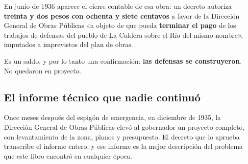 En junio de 1936 aparece el cierre contable de esa obra: un decreto autoriza \textbf{treinta
y dos pesos con ochenta y siete centavos} a favor de la Dirección General de Obras Públicas
«a objeto de que pueda \textbf{terminar el pago} de los trabajos de defensas del pueblo de La
Caldera sobre el Río del mismo nombre», imputados a imprevistos del plan de obras.

Es un saldo, y por lo tanto una confirmación: \textbf{las defensas se construyeron}. No
quedaron en proyecto.

\subsection*{El informe técnico que nadie continuó}

Once meses después del espigón de emergencia, en diciembre de 1935, la Dirección General de
Obras Públicas elevó al gobernador un proyecto completo, con levantamiento de la zona,
planos y presupuesto. El decreto que lo aprueba transcribe el informe entero, y ese informe
es la mejor descripción del problema que este libro encontró en cualquier época.

